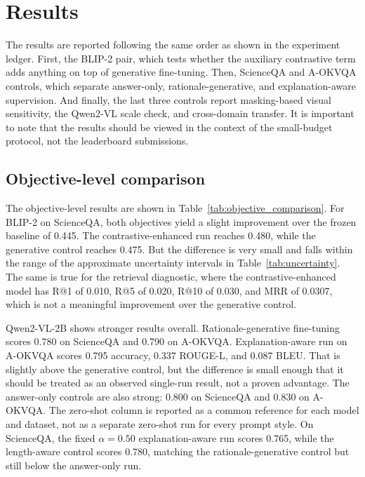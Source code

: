 \documentclass[preprint,12pt]{elsarticle}
\begin{document}
\FloatBarrier

\section{Results}
The results are reported following the same order as shown in the experiment ledger.
First, the BLIP-2 pair, which tests whether the auxiliary contrastive term adds anything on top of generative fine-tuning.
Then, ScienceQA and A-OKVQA controls, which separate answer-only, rationale-generative, and explanation-aware supervision.
And finally, the last three controls report masking-based visual sensitivity, the Qwen2-VL scale check, and cross-domain transfer.
It is important to note that the results should be viewed in the context of the small-budget protocol, not the leaderboard submissions.

\subsection{Objective-level comparison}
The objective-level results are shown in Table~\ref{tab:objective_comparison}.
For BLIP-2 on ScienceQA, both objectives yield a slight improvement over the frozen baseline of 0.445.
The contrastive-enhanced run reaches 0.480, while the generative control reaches 0.475.
But the difference is very small and falls within the range of the approximate uncertainty intervals in Table~\ref{tab:uncertainty}.
The same is true for the retrieval diagnostic, where the contrastive-enhanced model has R@1 of 0.010, R@5 of 0.020, R@10 of 0.030, and MRR of 0.0307, which is not a meaningful improvement over the generative control.

Qwen2-VL-2B shows stronger results overall.
Rationale-generative fine-tuning scores 0.780 on ScienceQA and 0.790 on A-OKVQA.
Explanation-aware run on A-OKVQA scores 0.795 accuracy, 0.337 ROUGE-L, and 0.087 BLEU.
That is slightly above the generative control, but the difference is small enough that it should be treated as an observed single-run result, not a proven advantage.
The answer-only controls are also strong: 0.800 on ScienceQA and 0.830 on A-OKVQA.
The zero-shot column is reported as a common reference for each model and dataset, not as a separate zero-shot run for every prompt style.
On ScienceQA, the fixed $\alpha=0.50$ explanation-aware run scores 0.765, while the length-aware control scores 0.780, matching the rationale-generative control but still below the answer-only run.
\end{document}

